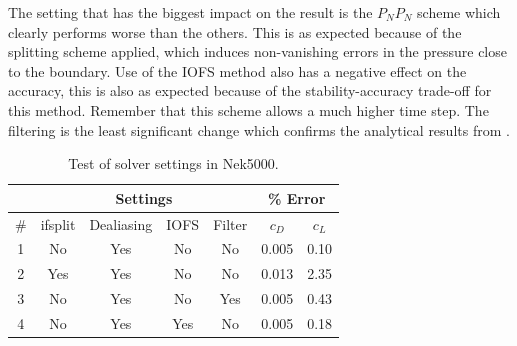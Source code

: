 The setting that has the biggest impact on the result is the $P_NP_N$ scheme which clearly performs 
worse than the others. This is as expected because of the splitting scheme applied, which 
induces non-vanishing errors in the pressure close to the boundary. 
Use of the IOFS method also has a negative effect on the accuracy,
this is also as expected because of the stability-accuracy trade-off for this method.
Remember that this scheme allows a much higher time step. The filtering is the least significant change
which confirms the analytical results from . 
%
\begin{table}[h]
    \centering
    \begin{tabular}{c | c c c c | c c }
         & \multicolumn{4}{|c|}{Settings} & \multicolumn{2}{|c}{\% Error} \\\hline
         \#  & ifsplit & Dealiasing & IOFS & Filter & $c_D$ & $c_L$ \\  \hline 
         1 & No & Yes& No & No & 0.005 & 0.10\\
         2 & Yes& Yes& No & No & 0.013 & 2.35\\
         3 & No & Yes& No & Yes& 0.005 & 0.43\\
         4 & No & Yes& Yes& No & 0.005 & 0.18\\
    \end{tabular}
    \caption{Test of solver settings in Nek5000.}
    \label{tab:perf}
\end{table}
%

